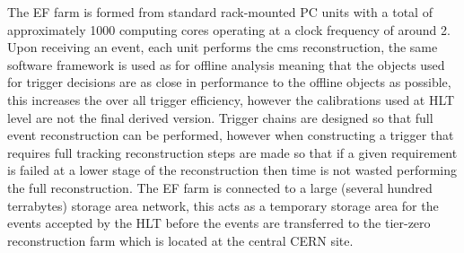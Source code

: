 The EF farm is formed from standard rack-mounted PC units with a total of 
approximately 1000 computing cores operating at a clock frequency of around 
\unit{2}{\giga\hertz}. Upon receiving an event, each unit performs the \ac{cms} 
reconstruction, the same software framework is used as for offline analysis 
meaning that the objects used for trigger decisions are as close in performance 
to the offline objects as possible,  this increases the over all trigger 
efficiency, however the calibrations used at HLT level are not the final 
derived version. 
Trigger chains are designed so that full event reconstruction can be performed, 
however when constructing a trigger that requires full tracking reconstruction 
steps are made so that if a given requirement is failed at a lower stage of the 
reconstruction then time is not wasted performing the full reconstruction. The 
EF farm is connected to a large (several hundred terrabytes) storage area 
network, this acts as a temporary storage area for the events accepted by the 
HLT before the events are transferred to the tier-zero reconstruction farm 
which is located at the central CERN site.



